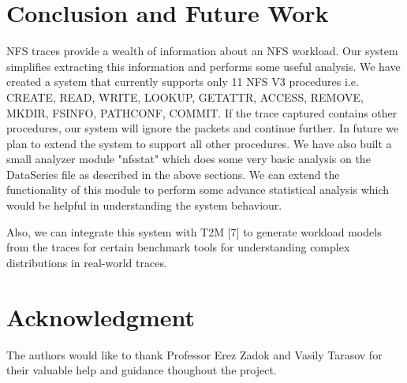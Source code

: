 \documentclass[conference]{IEEEtran}
\begin{document}
\section{Conclusion and Future Work}
NFS traces provide a wealth of information about an NFS workload. Our system simplifies extracting this information
and performs some useful analysis. We have created a system that currently supports only 11 NFS V3 procedures i.e. CREATE, READ, WRITE, LOOKUP, GETATTR, ACCESS, REMOVE, MKDIR, FSINFO, PATHCONF, COMMIT. If the trace captured contains other procedures, our system will ignore the packets and continue further. In future we plan to extend the system to support all other procedures. We have also built a small analyzer module "nfsstat" which does some very basic analysis on the DataSeries file as described in the above sections. We can extend the functionality of this module to perform some advance statistical analysis which would be helpful in understanding the system behaviour.

Also, we can integrate this system with T2M [7] to generate workload models from the traces for certain benchmark tools for understanding complex distributions in real-world traces.




\section*{Acknowledgment}

The authors would like to thank Professor Erez Zadok and Vasily Tarasov for their valuable help and guidance thoughout the project.


\end{document}

